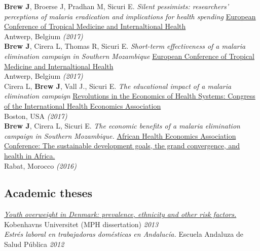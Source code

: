 \documentclass[11pt]{article}
\begin{document}
\noindent \textbf{Brew J}, Broerse J, Pradhan M, Sicuri E. \emph{Silent pessimists: researchers' perceptions of malaria eradication and implications for health spending} \href{http://www.ectmih2017.be/}{European Conference of Tropical Medicine and Internaltional Health} \\
Antwerp, Belgium \hfill \emph{(2017)}\\

\noindent \textbf{Brew J}, Cirera L, Thomas R, Sicuri E. \emph{Short-term effectiveness of a malaria elimination campaign in Southern Mozambique} \href{http://www.ectmih2017.be/}{European Conference of Tropical Medicine and Internaltional Health} \\
Antwerp, Belgium \hfill \emph{(2017)}\\

\noindent Cirera L, \textbf{Brew J}, Vall J., Sicuri E. \emph{The educational impact of a malaria elimination campaign} \href{https://www.healtheconomics.org/page/BostonCongress2017}{Revolutions in the Economics of Health Systems: Congress of the International Health Economics Association} \\
Boston, USA \hfill \emph{(2017)}\\


\noindent \textbf{Brew J}, Cirera L, Sicuri E. \emph{The economic benefits of a malaria elimination campaign in Southern Mozambique.} \href{http://afhea.org/en/conferences/conference-2016-rabat}{African Health Economics Association Conference: The sustainable development goals, the grand convergence, and health in Africa.} \\
Rabat, Morocco \hfill \emph{(2016)}\\



\subsection*{Academic theses}

\noindent \emph{\href{http://info.skolesundhed.dk/wp-content/uploads/2012/10/Speciale-af-Joseph-Brew.pdf}{Youth overweight in Denmark: prevalence, ethnicity and other risk factors.}} Kobenhavns Universitet (MPH dissertation) \hfill \emph{2013}\\

\noindent \emph{Estrés laboral en trabajadoras domésticas en Andalucía. } Escuela Andaluza de Salud Pública  \hfill \emph{2012}\\
\end{document}

